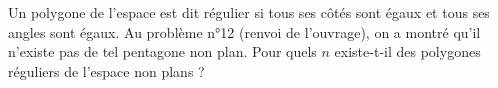 Un polygone de l'espace est dit régulier si tous ses côtés sont égaux et tous ses angles sont égaux. Au problème n°12 (renvoi de l'ouvrage), on a montré qu'il n'existe pas de tel pentagone non plan. Pour quels $n$ existe-t-il des polygones réguliers de l'espace non plans ?
